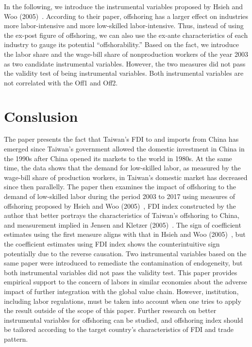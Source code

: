 \documentclass{article}
\begin{document}
In the following, we introduce the instrumental variables proposed by Hsieh and Woo (2005)~\cite{hsieh2005impact}. According to their paper, offshoring has a larger effect on industries more labor-intensive and more low-skilled labor-intensive. Thus, instead of using the ex-post figure of offshoring, we can also use the ex-ante characteristics of each industry to gauge its potential “offshorability.” Based on the fact, we introduce the labor share and the wage-bill share of nonproduction workers of the year 2003 as two candidate instrumental variables. However, the two measures did not pass the validity test of being instrumental variables. Both instrumental variables are not correlated with the Off1 and Off2.\par


\section{Conslusion}

The paper presents the fact that Taiwan’s FDI to and imports from China has emerged since Taiwan’s government allowed the domestic investment in China in the 1990s after China opened its markets to the world in 1980s. At the same time, the data shows that the demand for low-skilled labor, as measured by the wage-bill share of production workers, in Taiwan’s domestic market has decreased since then parallelly. The paper then examines the impact of offshoring to the demand of low-skilled labor during the period 2003 to 2017 using measures of offshoring proposed by Hsieh and Woo (2005)~\cite{hsieh2005impact}, FDI index constructed by the author that better portrays the characteristics of Taiwan’s offshoring to China, and measurement implied in Jensen and Kletzer (2005)~\cite{jensen2005tradable}. The sign of coefficient estimates using the first measure aligns with that in Hsieh and Woo (2005)~\cite{hsieh2005impact}, but the coefficient estimates using FDI index shows the counterintuitive sign potentially due to the reverse causation. Two instrumental variables based on the same paper were introduced to remediate the contamination of endogeneity, but both instrumental variables did not pass the validity test. This paper provides empirical support to the concern of labors in similar economies about the adverse impact of further integration with the global value chain. However, institution, including labor regulations, must be taken into account when one tries to apply the result outside of the scope of this paper. Further research on better instrumental variables for offshoring can be studied, and offshoring index should be tailored according to the target country’s characteristics of FDI and trade pattern.\par

	
\end{document}
